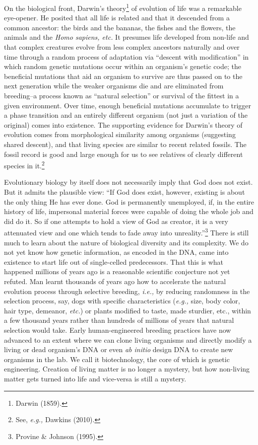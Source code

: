 \begin{multicols}{2}
On the biological front, Darwin's theory\footnote{Darwin (1859).} of evolution of life was a remarkable eye-opener. He posited that all life is related and that it descended from a common ancestor: the birds and the bananas, the fishes and the flowers, the animals and the \textit{Homo sapiens, etc.} It presumes life developed from non-life and that complex creatures evolve from less complex ancestors naturally and over time through a random process of adaptation via “descent with modification” in which random genetic mutations occur within an organism's genetic code; the beneficial mutations that aid an organism to survive are  thus passed on to the next generation while the weaker organisms die and are eliminated from breeding--a process known as “natural selection” or survival of the fittest in a given environment. Over time, enough beneficial mutations accumulate to trigger a phase transition and an entirely different organism (not just a variation of the original) comes into existence. The supporting evidence for Darwin's theory of evolution comes from morphological similarity among organisms (suggesting shared descent), and that living species are similar to recent related fossils. The fossil record is good and large enough for us to see relatives of clearly different species in it.\footnote{See, \textit{e.g.,} Dawkins (2010).}

Evolutionary biology by itself does not necessarily imply that God does not exist. But it admits the plausible view: “If God does exist, however, existing is about the only thing He has ever done. God is permanently unemployed, if, in the entire history of life, impersonal material forces were capable of doing the whole job and did do it. So if one attempts to hold a view of God as creator, it is a very attenuated view and one which tends to fade away into unreality.”\footnote{Provine \& Johnson (1995).}  There is still much to learn about the nature of biological diversity and its complexity. We do not yet know how genetic information, as encoded in the DNA, came into existence to start life out of single-celled predecessors. That this is what happened millions of years ago is a reasonable scientific conjecture not yet refuted. Man learnt thousands of years ago how to accelerate the natural evolution process through selective breeding, \textit{i.e.,} by reducing randomness in the selection process, say, dogs with specific characteristics (\textit{e.g.,} size, body color, hair type, demeanor, \textit{etc.}) or plants modified to taste, made sturdier, etc., within a few thousand years rather than hundreds of millions of years that natural selection would take. Early human-engineered breeding practices have now advanced to an extent where we can clone living organisms and directly modify a living or dead organism's DNA or even \textit{ab initio} design DNA to create new organisms in the lab. We call it biotechnology, the core of which is genetic engineering. Creation of living matter is no longer a mystery, but how non-living matter gets turned into life and vice-versa is still a mystery.


\end{multicols}
